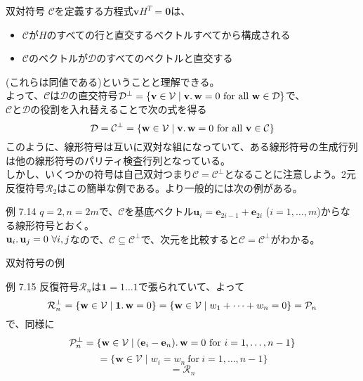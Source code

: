 \documentclass[dvipdfmx,10pt,jsarticle]{beamer}
\begin{document}
  \begin{frame}{双対符号}
    $\mathcal{C}$を定義する方程式$\mathbf{v}H^T = \mathbf{0}$は、
    \begin{itemize}
      \item $\mathcal{C}$が$H$のすべての行と直交するベクトルすべてから構成される
      \item $\mathcal{C}$のベクトルが$\mathcal{D}$のすべてのベクトルと直交する
    \end{itemize}
    (これらは同値である)ということと理解できる。\\
    よって、$\mathcal{C}$は$\mathcal{D}$の直交符号$\mathcal{D}^\perp = \lbrace \mathbf{v} \in \mathcal{V} \mid \mathbf{v}\ldotp\mathbf{w} = 0 \ \text{for all} \ \mathbf{w} \in \mathcal{D} \rbrace$で、\\
    $\mathcal{C}$と$\mathcal{D}$の役割を入れ替えることで次の式を得る
    \[ \mathcal{D} = \mathcal{C}^\perp = \lbrace \mathbf{w} \in \mathcal{V} \mid \mathbf{v}\ldotp\mathbf{w} = 0 \ \text{for all} \ \mathbf{v} \in \mathcal{C} \rbrace \]
    このように、線形符号は互いに双対な組になっていて、ある線形符号の生成行列は他の線形符号のパリティ検査行列となっている。\\
    しかし、いくつかの符号は自己双対つまり$\mathcal{C}=\mathcal{C}^\perp$となることに注意しよう。2元反復符号$\mathcal{R}_2$はこの簡単な例である。より一般的には次の例がある。
    \begin{block}{例 7.14}
      $q = 2, n = 2m$で、$\mathcal{C}$を基底ベクトル$\mathbf{u}_i = \mathbf{e}_{2i - 1} + \mathbf{e}_{2i}$ ($i = 1, \ldots , m$)からなる線形符号とおく。\\
      $\mathbf{u}_i\ldotp\mathbf{u}_j = 0 \ \forall i, j$なので、$\mathcal{C} \subseteq \mathcal{C}^\perp$で、次元を比較すると$\mathcal{C} = \mathcal{C}^\perp$がわかる。
    \end{block}
  \end{frame}
  \begin{frame}{双対符号の例}
    \begin{block}{例 7.15}
      反復符号$\mathcal{R}_n$は$\mathbf{1}=1\ldots1$で張られていて、よって
      \[ \mathcal{R}_n^\perp = \lbrace \mathbf{w} \in \mathcal{V} \mid \mathbf{1} \ldotp \mathbf{w} = 0 \rbrace = \lbrace \mathbf{w} \in \mathcal{V} \mid w_1 + \cdots + w_n = 0 \rbrace = \mathcal{P}_n \]
      で、同様に
    \[\mathcal{P}_n^\perp = \lbrace \mathbf{w} \in \mathcal{V} \mid (\mathbf{e}_i - \mathbf{e}_n)\ldotp\mathbf{w} = 0 \ \text{for}\ i = 1,\ldots,n-1 \rbrace \]
      \[= \lbrace \mathbf{w} \in \mathcal{V} \mid w_i = w_n \ \text{for} \ i = 1,\ldots , n-1 \rbrace \]
      \[= \mathcal{R}_n \]
    \end{block}
  \end{frame}
\end{document}
